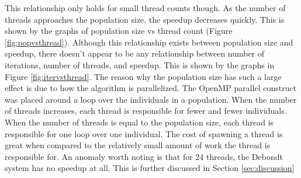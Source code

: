 \documentclass[10pt,letterpaper]{article}
\begin{document}
This relationship only holds for small thread counts though. As the number of threads approaches the population size, the speedup decreases quickly. This is shown by the graphs of population size vs thread count (Figure \ref{fig:popvsthread}). Although this relationship exists between population size and speedup, there doesn't appear to be any relationship between number of iterations, number of threads, and speedup. This is shown by the graphs in Figure \ref{fig:itervsthread}. The reason why the population size has such a large effect is due to how the algorithm is parallelized. The OpenMP parallel construct was placed around a loop over the individuals in a population. When the number of threads increases, each thread is responsible for fewer and fewer individuals. When the number of threads is equal to the population size, each thread is responsible for one loop over one individual. The cost of spawning a thread is great when compared to the relatively small amount of work the thread is responsible for. An anomaly worth noting is that for 24 threads, the Debondt system has no speedup at all. This is further discussed in Section \ref{sec:discussion}
\end{document}
